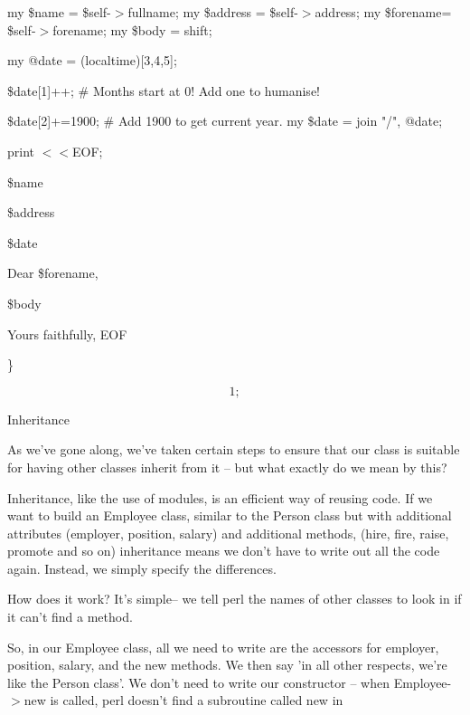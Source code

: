\documentclass[a4paper,11pt]{book}
\begin{document}
\noindent my \$name = \$self-$>$fullname; my \$address = \$self-$>$address; my \$forename= \$self-$>$forename; my \$body = shift;

\noindent my @date = (localtime)[3,4,5];

\noindent \$date[1]++; \# Months start at 0! Add one to humanise!

\noindent \$date[2]+=1900;  \# Add 1900 to get current year. my \$date = join "/", @date;

\noindent 

\noindent print $<$$<$EOF;

\noindent \$name

\noindent \$address

\noindent 

\noindent \$date

\noindent 

\noindent Dear \$forename,

\noindent 

\noindent \$body

\noindent 

\noindent Yours faithfully, EOF

\noindent \}

\noindent 

\[1;\] 


\noindent 

\noindent Inheritance

\noindent 

\noindent As we've gone along, we've taken certain steps to ensure that our class is suitable for having other classes inherit from it -- but what exactly do we mean by this?

\noindent 

\noindent Inheritance, like the use of modules, is an efficient way of reusing code. If we want to build an Employee class, similar to the Person class but with additional attributes (employer, position, salary) and additional methods, (hire, fire, raise, promote and so on) inheritance means we don't have to write out all the code again. Instead, we simply specify the differences.

\noindent 

\noindent How does it work? It's simple-- we tell perl the names of other classes to look in if it can't find a method.

\noindent So, in our Employee class, all we need to write are the accessors for employer, position, salary, and the new methods. We then say 'in all other respects, we're like the Person class'. We don't need to write our constructor -- when Employee-$>$new is called, perl doesn't find a subroutine called new in
\end{document}
